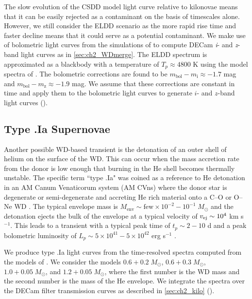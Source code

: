 The slow evolution of the CSDD model light curve relative to kilonovae means that it can be easily rejected as a contaminant on the basis of timescales alone. However, we still consider the ELDD scenario as the more rapid rise time and faster decline means that it could serve as a potential contaminant. We make use of bolometric light curves from the simulations of \citet{Sim+12} to compute DECam {\em i}- and {\em z}-band light curves as in \cref{sec:ch2_WDmerge}. The ELDD spectrum is approximated as a blackbody with a temperature of $T_p \approx 4800$ K using the model spectra of \citet[see their Figure 7]{Sim+12}. The bolometric corrections are found to be $m_{\text{bol}} - m_{\text{i}} \approx -1.7$  mag and $m_{\text{bol}} - m_{\text{z}} \approx -1.9$ mag. We assume that these corrections are constant in time and apply them to the bolometric light curves to generate $i$- and $z$-band light curves ().

\subsection{Type .Ia Supernovae}
\label{sec:ch2_type.Ia}
Another possible WD-based transient is the detonation of an outer shell of helium on the surface of the WD. This can occur when the mass accretion rate from the donor is low enough that burning in the He shell becomes thermally unstable. The specific term ``type .Ia" was coined as a reference to He detonation in an AM Canum Venaticorum system (AM CVns) where the donor star is degenerate or semi-degenerate and accreting He rich material onto a C--O or O--Ne WD \citet{Bildsten+07,Shen+10}. The typical envelope mass is $M_{\text{env}} \sim \text{few}\times10^{-2}-10^{-1}\;M_{\odot}$ and the detonation ejects the bulk of the envelope at a typical velocity of $v_{\rm ej} \sim 10^4$ km s$^{-1}$. This leads to a transient with a typical peak time of $t_p \sim 2-10$ d and a peak bolometric luminosity of $L_p \sim 5\times10^{41} - 5\times 10^{42}$ erg s$^{-1}$ \citep{Shen+10}.

We produce type .Ia light curves from the time-resolved spectra computed from the models of \citet{Shen+10}. We consider the models $0.6+0.2\;M_{\odot}$, $0.6+0.3\;M_{\odot}$, $1.0+0.05\;M_{\odot}$, and $1.2+0.05\;M_{\odot}$, where the first number is the WD mass and the second number is the mass of the He envelope. We integrate the spectra over the DECam filter transmission curves as described in \cref{sec:ch2_kilo} ().

